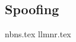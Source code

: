 \documentclass{article}
\begin{document}
\subsection{Spoofing}

{nbns.tex}
{llmnr.tex}
\end{document}
